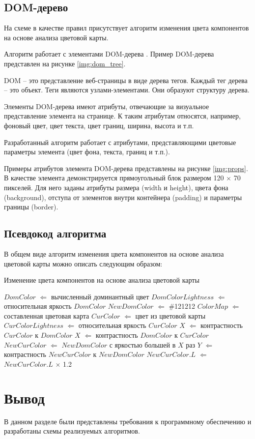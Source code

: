 \subsection{DOM-дерево}

На схеме в качестве правил присутствует алгоритм изменения цвета компонентов на основе анализа цветовой карты.

Алгоритм работает с элементами DOM-дерева \cite{dom}. Пример DOM-дерева представлен на рисунке \ref{img:dom_tree}.


DOM -- это представление веб-страницы в виде дерева тегов. Каждый тег дерева -- это объект. Теги являются узлами-элементами. Они образуют структуру дерева.

Элементы DOM-дерева имеют атрибуты, отвечающие за визуальное представление элемента на странице. К таким атрибутам относятся, например, фоновый цвет, цвет текста, цвет границ, ширина, высота и т.п.

Разработанный алгоритм работает с атрибутами, представляющими цветовые параметры элемента (цвет фона, текста, границ и т.п.).

Примеры атрибутов элемента DOM-дерева представлены на рисунке \ref{img:props}. В качестве элемента демонстрируется прямоугольный блок размером 120 $\times$ 70 пикселей. Для него заданы атрибуты размера (width и height), цвета фона (background), отступа от элементов внутри контейнера (padding) и параметры границы (border).


\subsection{Псевдокод алгоритма}

В общем виде алгоритм изменения цвета компонентов на основе анализа цветовой карты можно описать следующим образом:

\begin{algorithm}[H]
	\caption{Изменение цвета компонентов на основе анализа цветовой карты}
	\label{alg:analchange}
	\begin{algorithmic}[1]
		\State $DomColor$ $\Leftarrow$ вычисленный доминантный цвет
		\State $DomColorLightness$ $\Leftarrow$ относительная яркость $DomColor$
		\State $NewDomColor$ $\Leftarrow$ \#121212
		\State $ColorMap$ $\Leftarrow$ составленная цветовая карта
		\State $CurColor$ $\Leftarrow$ цвет из цветовой карты
		\State $CurColorLightness$ $\Leftarrow$ относительная яркость $CurColor$
		\State $X$ $\Leftarrow$ контрастность $CurColor$ к $DomColor$
		\Else
		\State $X$ $\Leftarrow$ контрастность $DomColor$ к $CurColor$
		\EndIf
		\State $NewCurColor$ $\Leftarrow$ $NewDomColor$ с яркостью большей в $X$ раз
		\State $Y$ $\Leftarrow$ контрастность $NewCurColor$ к $NewDomColor$
		\State $NewCurColor.L$ $\Leftarrow$ $NewCurColor.L$ $\times$ 1.2
		\EndWhile
		\EndFor
	\end{algorithmic}
\end{algorithm}

\section*{Вывод}

В данном разделе были представлены требования к программному обеспечению и разработаны схемы реализуемых алгоритмов.